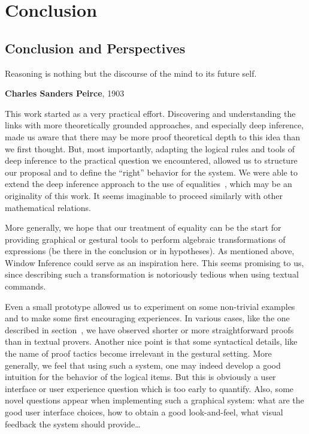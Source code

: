 \setchapterpreamble[u]{\margintoc}
\chapter{Conclusion}



\section{Conclusion and Perspectives}

\epigraph{ Reasoning is nothing but the discourse of the mind to its future
  self. }{\textbf{Charles Sanders Peirce}, 1903 }

This work started as a very practical effort. Discovering and
understanding the links with more theoretically grounded approaches,
and especially deep inference, made us aware that there may be more
proof theoretical depth to this idea than we first thought. But, most
importantly, adapting the logical rules and tools of deep inference to
the practical question we encountered, allowed us to structure our
proposal and to define the ``right'' behavior for the system. We were
able to extend the deep inference approach to the use of
equalities~, which may be an originality of this
work. It seems imaginable to proceed similarly with other mathematical
relations. 

More generally, we hope that our treatment of equality can be the
start for providing graphical or gestural tools to perform algebraic
transformations of expressions (be there in the conclusion or in
hypotheses). As mentioned above, Window Inference could serve as an
inspiration here. This seems promising to us, since describing such a
transformation is notoriously tedious when using textual commands.

Even a small prototype allowed us to experiment on some non-trivial
examples and to make some first encouraging experiences. In various
cases, like the one described in section~, we have
observed shorter or more straightforward proofs than in textual
provers. Another nice point is that some syntactical details, like the
name of proof tactics become irrelevant in the gestural setting. More
generally, we feel that using such a system, one may indeed develop a
good intuition for the behavior of the logical items. But this is
obviously a user interface or user experience question which is too
early to quantify. Also, some novel questions appear when implementing
such a graphical system: what are the good user interface choices, how
to obtain a good look-and-feel, what visual feedback the system should
provide\dots

